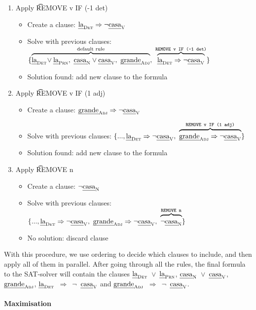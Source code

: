 \begin{enumerate}
\item Apply \t{REMOVE v IF (-1 det)}
 \begin{itemize}
    \item Create a clause: $\text{\em la}_{\text{\sc Det}} \Rightarrow \neg \text{\em casa}_{\text{\sc V}}$
    \item Solve with previous clauses:
  $\{ \ob{\laDet \! \vee \laPrn, \ \casaN \vee \casaV, \  \grandeAdj}^{\text{default rule}}, \
      \ob{\laDet \Rightarrow \neg \casaV}^{\t{REMOVE v IF (-1 det)}} \}$
    \item Solution found: add new clause to the formula
 \end{itemize}
\item Apply \t{REMOVE v IF (1 adj)}
 \begin{itemize}
    \item Create a clause: $\text{\em grande}_{\text{\sc Adj}} \Rightarrow \neg \text{\em casa}_{\text{\sc V}}$
    \item Solve with previous clauses:
  $\{..., \laDet \Rightarrow \neg \casaV, \
      \ob{\grandeAdj \Rightarrow \neg \casaV}^{\t{REMOVE v IF (1 adj)}}  \}$
    \item Solution found: add new clause to the formula
 \end{itemize}
\item Apply \t{REMOVE n}
 \begin{itemize}
    \item Create a clause: $\neg \text{\em casa}_{\text{\sc N}}$
    \item Solve with previous clauses:
      $\{ ..., \laDet \Rightarrow \neg \casaV, \
      \grandeAdj \Rightarrow \neg \casaV, \
      \ob{\neg \casaN}^{\t{REMOVE n}} \}$
    \item No solution: discard clause
 \end{itemize}

\end{enumerate}

With this procedure, we use ordering to decide which clauses to include, and
then apply all of them in parallel.
After going through all the rules, the final formula to the SAT-solver will contain the clauses
$\text{\em la}_{\text{\sc Det}}$~$\vee$~$\text{\em la}_{\text{\sc Prn}}$, $\text{\em casa}_{\text{\sc N}}$~$\vee$~$\text{\em casa}_{\text{\sc V}}$,  $\text{\em grande}_{\text{\sc Adj}}$, $\text{\em la}_{\text{\sc Det}}$~$\Rightarrow$~$\neg$~$\text{\em casa}_{\text{\sc V}}$ and $\text{\em grande}_{\text{\sc Adj}}$~$\Rightarrow$~$\neg$~$\text{\em casa}_{\text{\sc V}}$.


\paragraph{Maximisation}

